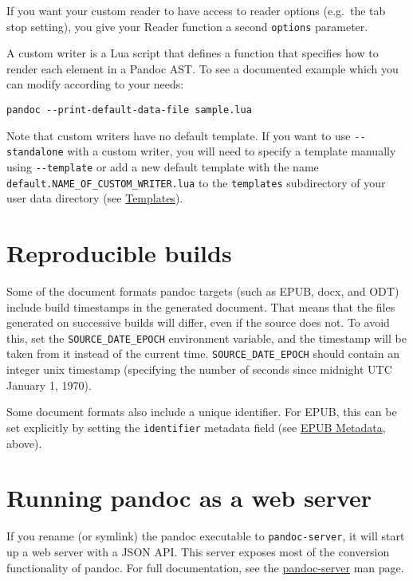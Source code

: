 \documentclass[
]{article}
\begin{document}
If you want your custom reader to have access to reader options
(e.g.~the tab stop setting), you give your Reader function a second
\texttt{options} parameter.

A custom writer is a Lua script that defines a function that specifies
how to render each element in a Pandoc AST. To see a documented example
which you can modify according to your needs:

\begin{verbatim}
pandoc --print-default-data-file sample.lua
\end{verbatim}

Note that custom writers have no default template. If you want to use
\texttt{-\/-standalone} with a custom writer, you will need to specify a
template manually using \texttt{-\/-template} or add a new default
template with the name \texttt{default.NAME\_OF\_CUSTOM\_WRITER.lua} to
the \texttt{templates} subdirectory of your user data directory (see
\hyperref[templates]{Templates}).

\section{Reproducible builds}\label{reproducible-builds}

Some of the document formats pandoc targets (such as EPUB, docx, and
ODT) include build timestamps in the generated document. That means that
the files generated on successive builds will differ, even if the source
does not. To avoid this, set the \texttt{SOURCE\_DATE\_EPOCH}
environment variable, and the timestamp will be taken from it instead of
the current time. \texttt{SOURCE\_DATE\_EPOCH} should contain an integer
unix timestamp (specifying the number of seconds since midnight UTC
January 1, 1970).

Some document formats also include a unique identifier. For EPUB, this
can be set explicitly by setting the \texttt{identifier} metadata field
(see \hyperref[epub-metadata]{EPUB Metadata}, above).

\section{Running pandoc as a web
server}\label{running-pandoc-as-a-web-server}

If you rename (or symlink) the pandoc executable to
\texttt{pandoc-server}, it will start up a web server with a JSON API.
This server exposes most of the conversion functionality of pandoc. For
full documentation, see the
\href{https://github.com/jgm/pandoc/blob/master/doc/pandoc-server.md}{pandoc-server}
man page.
\end{document}
